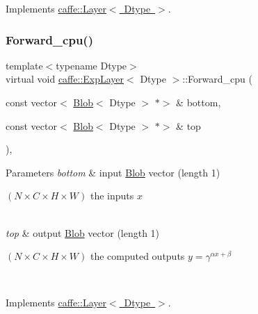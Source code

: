 Implements \mbox{\hyperlink{classcaffe_1_1_layer_a75c9b2a321dc713e0eaef530d02dc37f}{caffe\+::\+Layer$<$ Dtype $>$}}.

\mbox{\label{classcaffe_1_1_exp_layer_a5decf455b77628d5b2f996c26178153e}} 
\subsubsection{\texorpdfstring{Forward\+\_\+cpu()}{Forward\_cpu()}\hspace{0.1cm}{\footnotesize\ttfamily [1/2]}}
{\footnotesize\ttfamily template$<$typename Dtype$>$ \\
virtual void \mbox{\hyperlink{classcaffe_1_1_exp_layer}{caffe\+::\+Exp\+Layer}}$<$ Dtype $>$\+::Forward\+\_\+cpu (\begin{DoxyParamCaption}\item[{const vector$<$ \mbox{\hyperlink{classcaffe_1_1_blob}{Blob}}$<$ Dtype $>$ $\ast$$>$ \&}]{bottom,  }\item[{const vector$<$ \mbox{\hyperlink{classcaffe_1_1_blob}{Blob}}$<$ Dtype $>$ $\ast$$>$ \&}]{top }\end{DoxyParamCaption})\hspace{0.3cm}{\ttfamily [protected]}, {\ttfamily [virtual]}}


\begin{DoxyParams}{Parameters}
{\em bottom} & input \mbox{\hyperlink{classcaffe_1_1_blob}{Blob}} vector (length 1)
\begin{DoxyEnumerate}
\item $ (N \times C \times H \times W) $ the inputs $ x $ 
\end{DoxyEnumerate}\\
\hline
{\em top} & output \mbox{\hyperlink{classcaffe_1_1_blob}{Blob}} vector (length 1)
\begin{DoxyEnumerate}
\item $ (N \times C \times H \times W) $ the computed outputs $ y = \gamma ^ {\alpha x + \beta} $ 
\end{DoxyEnumerate}\\
\hline
\end{DoxyParams}


Implements \mbox{\hyperlink{classcaffe_1_1_layer_a576ac6a60b1e99fe383831f52a6cea77}{caffe\+::\+Layer$<$ Dtype $>$}}.

